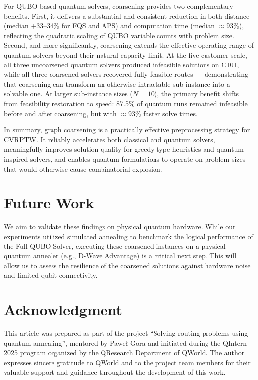 \documentclass[conference]{IEEEtran}
\begin{document}
For QUBO-based quantum solvers, coarsening provides two complementary benefits. First, it delivers a substantial and consistent reduction in both distance (median $+33$–$34\%$ for FQS and APS) and computation time (median $\approx93\%$), reflecting the quadratic scaling of QUBO variable counts with problem size. Second, and more significantly, coarsening extends the effective operating range of quantum solvers beyond their natural capacity limit. At the five-customer scale, all three uncoarsened quantum solvers produced infeasible solutions on C101, while all three coarsened solvers recovered fully feasible routes — demonstrating that coarsening can transform an otherwise intractable sub-instance into a solvable one. At larger sub-instance sizes ($N=10$), the primary benefit shifts from feasibility restoration to speed: 87.5\% of quantum runs remained infeasible before and after coarsening, but with $\approx93\%$ faster solve times.



In summary, graph coarsening is a practically effective preprocessing strategy for CVRPTW. It reliably accelerates both classical and quantum solvers, meaningfully improves solution quality for greedy-type heuristics and quantum inspired solvers, and enables quantum formulations to operate on problem sizes that would otherwise cause combinatorial explosion. 






\section{Future Work}
We aim to validate these findings on physical quantum hardware. While our experiments utilized simulated annealing to benchmark the logical performance of the Full QUBO Solver, executing these coarsened instances on a physical quantum annealer (e.g., D-Wave Advantage) is a critical next step. This will allow us to assess the resilience of the coarsened solutions against hardware noise and limited qubit connectivity.

\newpage










\section*{Acknowledgment}
This article was prepared as part of the project “Solving routing problems using quantum annealing”, mentored by Paweł Gora and initiated during the QIntern 2025 program organized by the QResearch Department of QWorld. The author expresses sincere gratitude to QWorld and to the project team members for their valuable support and guidance throughout the development of this work.
\end{document}
